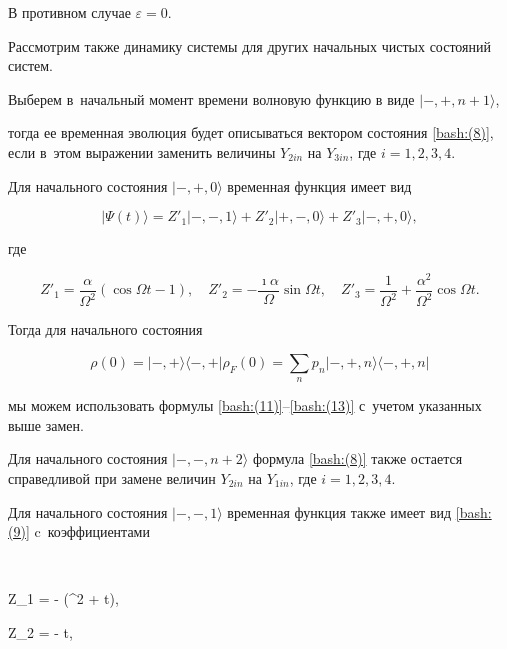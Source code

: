 В противном случае $\varepsilon = 0$.



Рассмотрим также динамику системы для других начальных чистых состояний систем. 

Выберем в~начальный момент времени волновую функцию в виде  $|-,+,n+1\rangle $, 

тогда ее временная эволюция будет описываться вектором состояния \eqref{bash:(8)}, если в~этом выражении заменить величины $Y_{2in}$ на $Y_{3in}$, где $i=1, 2, 3, 4$. 

Для начального состояния $|-,+, 0\rangle$ временная функция имеет вид

$$

|\Psi(t)\rangle = Z'_{1} |-,-, 1\rangle + Z'_{2} |+,-, 0\rangle  + Z'_{3} |-,+, 0\rangle,

$$

где

$$

Z'_{1} = \frac{\alpha}{ \Omega^2}( \cos \Omega t -1 ), \quad 

Z'_{2} =  - \frac{\imath \alpha }{\Omega} \sin \Omega t, \quad 

Z'_{3}  = \frac{1}{\Omega^2} + \frac{ \alpha^2}{ \Omega^2}  \cos \Omega t.

$$

Тогда для начального состояния

\begin{equation}

\rho(0) = |-,+\rangle \langle -,+| \rho_F(0) = \sum\limits_n p_n |-,+,n\rangle \langle -,+,n|

\label{bash:(14)}

\end{equation}

мы  можем использовать формулы \eqref{bash:(11)}--\eqref{bash:(13)} с~учетом указанных выше замен.



Для начального состояния $|-,-, n+2\rangle $ формула  \eqref{bash:(8)} также остается справедливой при замене величин $Y_{2in}$ на $Y_{1in}$, где $i=1, 2, 3, 4$. 

Для начального состояния  $|-,-, 1\rangle$ временная функция также имеет вид \eqref{bash:(9)}  c~коэффициентами

$$

Z_{1} = - (\alpha^2 + \cos \Omega t), \quad 

Z_{2} = - \frac{\imath}{\Omega} \sin \Omega t, \quad 

